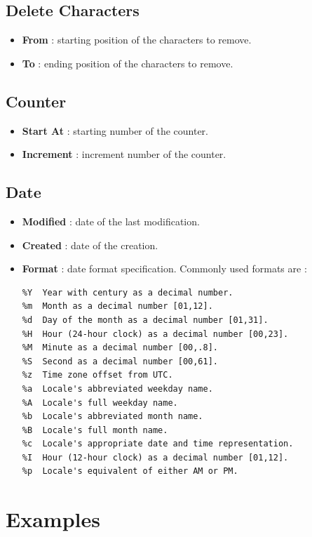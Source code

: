 \documentclass[10pt, a4paper]{scrartcl}
\begin{document}
\subsection*{Delete Characters}
\begin{itemize}
        \item \textbf{From} : starting position of the characters to remove.
        \item \textbf{To} : ending position of the characters to remove.
\end{itemize}

\subsection*{Counter}
\begin{itemize}
        \item \textbf{Start At} : starting number of the counter. 
        \item \textbf{Increment} : increment number of the counter.
\end{itemize}

\subsection*{Date}
\begin{itemize}
        \item \textbf{Modified} : date of the last modification.
        \item \textbf{Created} : date of the creation.
        \item \textbf{Format} : date format specification. Commonly used formats are :
                \begingroup
                \fontsize{8pt}{8pt}\selectfont
\begin{verbatim} 
%Y  Year with century as a decimal number.
%m  Month as a decimal number [01,12].
%d  Day of the month as a decimal number [01,31].
%H  Hour (24-hour clock) as a decimal number [00,23].
%M  Minute as a decimal number [00,.8].
%S  Second as a decimal number [00,61].
%z  Time zone offset from UTC.
%a  Locale's abbreviated weekday name.
%A  Locale's full weekday name.
%b  Locale's abbreviated month name.
%B  Locale's full month name.
%c  Locale's appropriate date and time representation.
%I  Hour (12-hour clock) as a decimal number [01,12].
%p  Locale's equivalent of either AM or PM.
\end{verbatim}
        \endgroup
\end{itemize}

\section{Examples}
\end{document}
